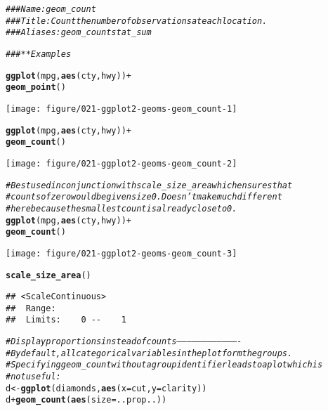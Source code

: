 \documentclass[a4paper,titlepage]{tufte-handout}\usepackage[]{graphicx}\usepackage[]{color}
\makeatletter
\def\maxwidth{ %
  \ifdim\Gin@nat@width>\linewidth
    \linewidth
  \else
    \Gin@nat@width
  \fi
}
\newcommand{\hlcom}[1]{\textcolor[rgb]{0.678,0.584,0.686}{\textit{#1}}}%
\newcommand{\hlopt}[1]{\textcolor[rgb]{0,0,0}{#1}}%
\newcommand{\hlstd}[1]{\textcolor[rgb]{0.345,0.345,0.345}{#1}}%
\newcommand{\hlkwb}[1]{\textcolor[rgb]{0.69,0.353,0.396}{#1}}%
\newcommand{\hlkwc}[1]{\textcolor[rgb]{0.333,0.667,0.333}{#1}}%
\newcommand{\hlkwd}[1]{\textcolor[rgb]{0.737,0.353,0.396}{\textbf{#1}}}%
\newenvironment{kframe}{%
 \def\at@end@of@kframe{}%
 \ifinner\ifhmode%
  \def\at@end@of@kframe{\end{minipage}}%
  \begin{minipage}{\columnwidth}%
 \fi\fi%
 \def\FrameCommand##1{\hskip\@totalleftmargin \hskip-\fboxsep
 \colorbox{shadecolor}{##1}\hskip-\fboxsep
     \hskip-\linewidth \hskip-\@totalleftmargin \hskip\columnwidth}%
 \MakeFramed {\advance\hsize-\width
   \@totalleftmargin\z@ \linewidth\hsize
   \@setminipage}}%
 {\par\unskip\endMakeFramed%
 \at@end@of@kframe}
\newenvironment{knitrout}{}{} %
\makeatother
\begin{document}
\begin{knitrout}
\color{fgcolor}\begin{kframe}
\begin{alltt}
\hlcom{### Name: geom_count}
\hlcom{### Title: Count the number of observations at each location.}
\hlcom{### Aliases: geom_count stat_sum}

\hlcom{### ** Examples}

\hlkwd{ggplot}\hlstd{(mpg,} \hlkwd{aes}\hlstd{(cty, hwy))} \hlopt{+}
 \hlkwd{geom_point}\hlstd{()}
\end{alltt}
\end{kframe}
\texttt{[image: figure/021-ggplot2-geoms-geom\_count-1]} 
\begin{kframe}\begin{alltt}
\hlkwd{ggplot}\hlstd{(mpg,} \hlkwd{aes}\hlstd{(cty, hwy))} \hlopt{+}
 \hlkwd{geom_count}\hlstd{()}
\end{alltt}
\end{kframe}
\texttt{[image: figure/021-ggplot2-geoms-geom\_count-2]} 
\begin{kframe}\begin{alltt}
\hlcom{# Best used in conjunction with scale_size_area which ensures that}
\hlcom{# counts of zero would be given size 0. Doesn't make much different}
\hlcom{# here because the smallest count is already close to 0.}
\hlkwd{ggplot}\hlstd{(mpg,} \hlkwd{aes}\hlstd{(cty, hwy))} \hlopt{+}
 \hlkwd{geom_count}\hlstd{()}
\end{alltt}
\end{kframe}
\texttt{[image: figure/021-ggplot2-geoms-geom\_count-3]} 
\begin{kframe}\begin{alltt}
 \hlkwd{scale_size_area}\hlstd{()}
\end{alltt}
\begin{verbatim}
## <ScaleContinuous>
##  Range:  
##  Limits:    0 --    1
\end{verbatim}
\begin{alltt}
\hlcom{# Display proportions instead of counts -------------------------------------}
\hlcom{# By default, all categorical variables in the plot form the groups.}
\hlcom{# Specifying geom_count without a group identifier leads to a plot which is}
\hlcom{# not useful:}
\hlstd{d} \hlkwb{<-} \hlkwd{ggplot}\hlstd{(diamonds,} \hlkwd{aes}\hlstd{(}\hlkwc{x} \hlstd{= cut,} \hlkwc{y} \hlstd{= clarity))}
\hlstd{d} \hlopt{+} \hlkwd{geom_count}\hlstd{(}\hlkwd{aes}\hlstd{(}\hlkwc{size} \hlstd{= ..prop..))}

\end{alltt}
\end{kframe}
\end{knitrout}
\end{document}
